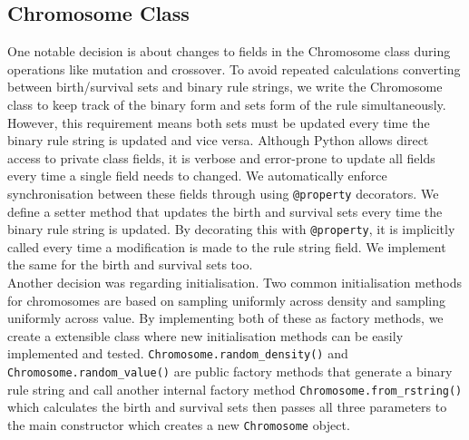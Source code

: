 \subsection{Chromosome Class}
One notable decision is about changes to fields in the Chromosome class during operations like mutation and crossover. To avoid repeated calculations converting between birth/survival sets and binary rule strings, we write the Chromosome class to keep track of the binary form and sets form of the rule simultaneously. However, this requirement means both sets must be updated every time the binary rule string is updated and vice versa. Although Python allows direct access to private class fields, it is verbose and error-prone to update all fields every time a single field needs to changed. We automatically enforce synchronisation between these fields through using \texttt{@property} decorators. We define a setter method that updates the birth and survival sets every time the binary rule string is updated. By decorating this with \texttt{@property}, it is implicitly called every time a modification is made to the rule string field. We implement the same for the birth and survival sets too.\\

Another decision was regarding initialisation. Two common initialisation methods for chromosomes are based on sampling uniformly across density and sampling uniformly across value. By implementing both of these as factory methods, we create a extensible class where new initialisation methods can be easily implemented and tested. \texttt{Chromosome.random\_density()} and \texttt{Chromosome.random\_value()} are public factory methods that generate a binary rule string and call another internal factory method \texttt{Chromosome.from\_rstring()} which calculates the birth and survival sets then passes all three parameters to the main constructor which creates a new \texttt{Chromosome} object.

